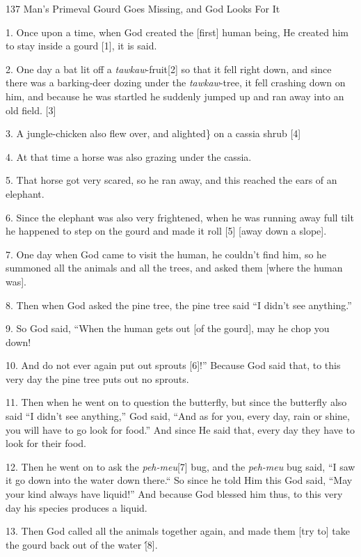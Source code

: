 
{\LARGE{}137 Man's Primeval Gourd Goes Missing, and God Looks For It}

{\LARGE{}1. Once upon a time, when God created the [first] human being, He created
him to stay inside a gourd [1], it is said.}

{\LARGE{}2. One day a bat lit off a }{\LARGE{}\textit{tawkaw}}{\LARGE{}-fruit[2]
so that it fell right down, and since there was a barking-deer dozing under the
}{\LARGE{}\textit{tawkaw}}{\LARGE{}-tree, it fell crashing down on him, and because
he was startled he suddenly jumped up and ran away into an old field. [3]}

{\LARGE{}3. A jungle-chicken also flew over, and alighted\} on a cassia shrub [4]}

{\LARGE{}4. At that time a horse was also grazing under the cassia.}

{\LARGE{}5. That horse got very scared, so he ran away, and this reached the ears
of an elephant.}

{\LARGE{}6. Since the elephant was also very frightened, when he was running away
full tilt he happened to step on the gourd and made it roll [5] [away down a slope].}

{\LARGE{}7. One day when God came to visit the human, he couldn't find him, so
he summoned all the animals and all the trees, and asked them [where the human
was].}

{\LARGE{}8. Then when God asked the pine tree, the pine tree said ``I didn't see
anything.''}

{\LARGE{}9. So God said, ``When the human gets out [of the gourd], may he chop
you down!}

{\LARGE{}10. And do not ever again put out sprouts [6]!'' Because God said that,
to this very day the pine tree puts out no sprouts.}

{\LARGE{}11. Then when he went on to question the butterfly, but since the butterfly
also said ``I didn't see anything,'' God said, ``And as for you, every day, rain
or shine, you will have to go look for food.'' And since He said that, every day
they have to look for their food.}

{\LARGE{}12. Then he went on to ask the }{\LARGE{}\textit{peh-meu}}{\LARGE{}[7]
bug, and the }{\LARGE{}\textit{peh-meu}}{\LARGE{} bug said, ``I saw it go down
into the water down there.``  So since he told Him this God said, ``May
your kind always have liquid!''  And because God blessed him thus, to this very
day his species produces a liquid.}

{\LARGE{}13. Then God called all the animals together again, and made them [try
to] take the gourd back out of the water [́8].}

